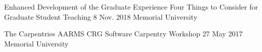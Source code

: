 \begin{cventries}
  \cventry
    {Enhanced Development of the Graduate Experience} %
    {Four Things to Consider for Graduate Student Teaching} %
    {8 Nov. 2018} %
    {Memorial University} %
    {
    }

  \cventry
    {The Carpentries} %
    {AARMS CRG Software Carpentry Workshop} %
    {27 May 2017} %
    {Memorial University} %
    {
    }


\end{cventries}
